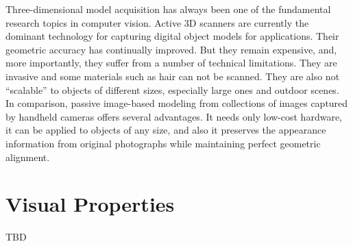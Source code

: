 Three-dimensional model acquisition has always been one of the fundamental research topics in computer vision. Active 3D scanners are currently the dominant technology for capturing digital object models for applications. Their geometric accuracy has continually improved. But they remain expensive, and, more importantly, they suffer from a number of technical limitations. They are invasive and some materials such as hair can not be scanned. They are also not ``scalable'' to objects of different sizes, especially large ones and outdoor scenes. In comparison, passive image-based modeling from collections of images captured by handheld cameras offers several advantages. It needs only low-cost hardware, it can be applied to objects of any size, and also it preserves the appearance information from original photographs while maintaining perfect geometric alignment.






\section{Visual Properties}
\label{sec:VisProp}

TBD





\endinput

